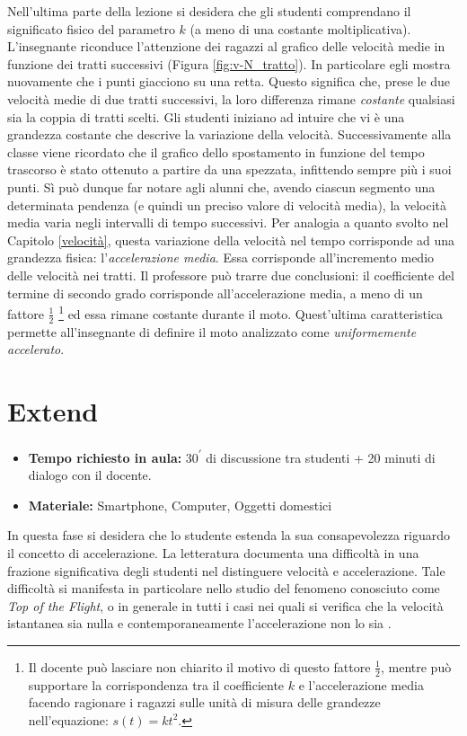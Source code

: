 \documentclass{report} \usepackage[T1]{fontenc} \usepackage[italian]{babel}
\begin{document}
Nell’ultima parte della lezione si desidera che gli studenti comprendano il
significato fisico del parametro $k$ (a meno di una costante moltiplicativa).
L’insegnante riconduce l’attenzione dei ragazzi al grafico delle
velocità medie in funzione dei tratti successivi (Figura \ref{fig:v-N_tratto}).
In particolare egli mostra nuovamente che i
punti giacciono su una retta. Questo significa che, prese le due velocità medie di
due tratti successivi, la loro differenza rimane \emph{costante} qualsiasi sia la coppia
di tratti scelti. Gli studenti iniziano ad intuire che vi è una grandezza costante che
descrive la variazione della velocità. Successivamente alla classe viene
ricordato che il grafico dello spostamento in funzione del tempo trascorso è
stato ottenuto a partire da una spezzata, infittendo sempre più i suoi punti.
Sì può dunque far notare agli alunni che, avendo ciascun segmento una determinata
pendenza (e quindi un preciso valore di velocità media), la velocità media
varia negli intervalli di tempo successivi. Per analogia a quanto svolto nel
Capitolo \ref{velocità}, questa variazione della velocità nel tempo corrisponde
ad una grandezza fisica: l’\emph{accelerazione media}. Essa corrisponde
all’incremento medio delle velocità nei tratti.
Il professore può trarre due conclusioni: il coefficiente del termine di
secondo grado corrisponde all’accelerazione media, a meno di un fattore $\frac{1}{2}$
\footnote{
          Il docente può lasciare non chiarito il motivo di questo fattore $\frac{1}{2}$,
          mentre può supportare la corrispondenza tra il coefficiente $k$ e l’accelerazione
          media facendo ragionare i ragazzi sulle unità di misura delle grandezze
          nell’equazione: $s(t) = kt^2$.
         }
ed essa rimane costante durante il moto.
Quest’ultima caratteristica permette all’insegnante di definire il moto
analizzato come \emph{uniformemente accelerato}.

\section{Extend}
\begin{itemize}
\item \textbf{Tempo richiesto in aula:} 30\textsuperscript{$\prime$}
      di discussione tra studenti + 20 minuti di dialogo con il
      docente.
\item \textbf{Materiale:} Smartphone, Computer, Oggetti domestici
\end{itemize}

In questa fase si desidera che lo studente estenda la sua consapevolezza
riguardo il concetto di accelerazione. La letteratura documenta una difficoltà
in una frazione significativa degli studenti nel distinguere velocità
e accelerazione. Tale difficoltà si manifesta in particolare nello studio
del fenomeno conosciuto come \emph{Top of the Flight}, o in generale
in tutti i casi nei quali si verifica che la velocità istantanea sia nulla
e contemporaneamente l'accelerazione non lo sia\cite{arons1997teaching}
\cite{trowbridge1981investigation}.
\end{document}
